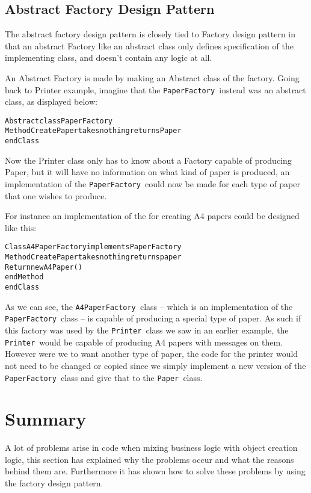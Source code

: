\subsection{Abstract Factory Design Pattern}

The abstract factory design pattern is closely tied to Factory design
pattern in that an abstract Factory like an abstract class only defines
specification of the implementing class, and doesn\textquoteright{}t
contain any logic at all. 

An Abstract Factory is made by making an Abstract class of the factory.
Going back to Printer example, imagine that the \texttt{PaperFactory
}instead was an abstract class, as displayed below:

\begin{alltt}
Abstract class PaperFactory 	
    Method CreatePaper takes nothing returns Paper 
endClass
\end{alltt}

Now the Printer class only has to know about a Factory capable of
producing Paper, but it will have no information on what kind of paper
is produced, an implementation of the \texttt{PaperFactory }could
now be made for each type of paper that one wishes to produce.

For instance an implementation of the for creating A4 papers could
be designed like this:

\begin{alltt}
Class A4PaperFactory implements PaperFactory 	
    Method CreatePaper takes nothing returns paper 
        Return new A4Paper() 	
    endMethod 
endClass
\end{alltt}

As we can see, the \texttt{A4PaperFactory }class -- which is an implementation
of the \texttt{PaperFactory }class -- is capable of producing a special
type of paper. As such if this factory was used by the \texttt{Printer
}class we saw in an earlier example, the \texttt{Printer }would be
capable of producing A4 papers with messages on them. However were
we to want another type of paper, the code for the printer would not
need to be changed or copied since we simply implement a new version
of the \texttt{PaperFactory }class and give that to the \texttt{Paper
}class.


\section*{Summary}

A lot of problems arise in code when mixing business logic with object
creation logic, this section has explained why the problems occur
and what the reasons behind them are. Furthermore it has shown how
to solve these problems by using the factory design pattern. 

